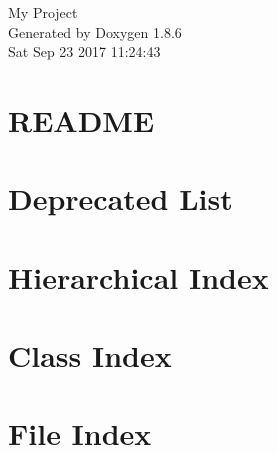 \documentclass[twoside]{book}
\newcommand{\clearemptydoublepage}{%
  \newpage{\pagestyle{empty}\cleardoublepage}%
}
\begin{document}
\hypersetup{pageanchor=false}
\begin{titlepage}
\vspace*{7cm}
\begin{center}%
{\Large My Project }\\
\vspace*{1cm}
{\large Generated by Doxygen 1.8.6}\\
\vspace*{0.5cm}
{\small Sat Sep 23 2017 11:24:43}\\
\end{center}
\end{titlepage}
\clearemptydoublepage
\tableofcontents
\clearemptydoublepage
{}
\hypersetup{pageanchor=true}

\chapter{R\-E\-A\-D\-M\-E}
\label{md__home_andre__desktop_tecprog__mayumi_no_tabi__mayumi_no_tabi__r_e_a_d_m_e}
\hypertarget{md__home_andre__desktop_tecprog__mayumi_no_tabi__mayumi_no_tabi__r_e_a_d_m_e}{}

\chapter{Deprecated List}
\label{deprecated}
\hypertarget{deprecated}{}

\chapter{Hierarchical Index}

\chapter{Class Index}

\chapter{File Index}

\end{document}
